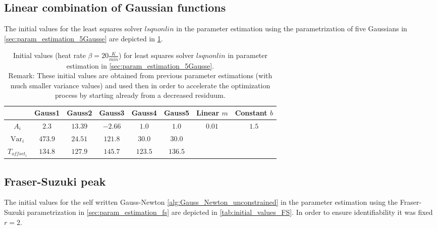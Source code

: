 \documentclass{scrartcl}[12pt, halfparskip]
\numberwithin{equation}{section}
\numberwithin{figure}{section}
\numberwithin{table}{section}
\newcommand{\var}{\operatorname{Var}}
\begin{document}
\subsection{Linear combination of Gaussian functions}
\label{sec:initial_values_5Gaussians}

The initial values for the least squares solver $lsqnonlin$ in the parameter estimation using the parametrization of five Gaussians in \cref{sec:param_estimation_5Gausse} are depicted in \cref{tab:initial_values_5Gausse}. 

\begin{table}[H]
	\centering
	\caption{Initial values (heat rate $\beta=20 \frac{K}{min}$) for least squares solver $lsqnonlin$ in parameter estimation in \cref{sec:param_estimation_5Gausse}. \\
		Remark: These initial values are obtained from previous parameter estimations (with much smaller variance values) and used then in order to accelerate the optimization process by starting already from a decreased residuum.}
	\begin{tabular}{| c | c | c | c | c | c || c | c |} \hline
		& Gauss1 & Gauss2 & Gauss3 & Gauss4 & Gauss5 & Linear $m$ & Constant $b$ \\ \hline
		$A_i$ & $2.3$ & $13.39$ & $-2.66$ & $1.0$ & $1.0$ & $0.01$ & $1.5$ \\
		$\var_i$ & $473.9$ & $24.51$ & $121.8$ & $30.0$ & $30.0$ & & \\
		$T_{offset_i}$ & $134.8$ & $127.9$ & $145.7$ & $123.5$ & $136.5$ & & \\ \hline
	\end{tabular}
	\label{tab:initial_values_5Gausse}
\end{table}


\subsection{Fraser-Suzuki peak}
\label{sec:initial_values_FS}

The initial values for the self written Gauss-Newton \cref{alg:Gauss_Newton_unconstrained} in the parameter estimation using the Fraser-Suzuki parametrization in \cref{sec:param_estimation_fs} are depicted in \cref{tab:initial_values_FS}. In order to ensure identifiability it was fixed $r=2$.
\end{document}
